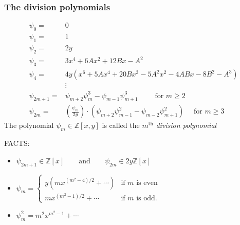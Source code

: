 \documentclass[10pt,handout]{beamer} %
\theoremstyle{definition}
\begin{document}
\begin{frame}\frametitle{The division polynomials}\pause

\begin{Definition}[Division Polynomials of $E:y^2=x^3+Ax+B$ ($p>3$)]\vspace*{-0.7cm}
\begin{align*}
        \psi_{0} =& 0\\
        \psi_{1} =& 1\\
        \psi_{2} =& 2y\\
        \psi_{3} =& 3x^{4} + 6Ax^{2} + 12Bx - A^{2}\\
        \psi_{4} =& 4y(x^{6} + 5Ax^{4} + 20Bx^{3} - 5A^{2}x^{2} - 4ABx - 8B^{2} - A^{3}) \\
        &\vdots\\
        \psi_{2m+1} =& \psi_{m+2}\psi_{m}^{3}-\psi_{m-1}\psi^{3}_{m+1} \qquad \text{ for } m \geq 2\\
        \psi_{2m}  =& \left(\frac{\psi_{m}}{2y}\right)\cdot(\psi_{m+2}\psi^{2}_{m-1}-\psi_{m-2}\psi^{2}_{m+1}) \quad \text{ for } m \geq 3
\end{align*}
The polynomial $\psi_m\in{\mathbb Z}[x,y]$ is called the $m^{\text{th}}$ \emph{division polynomial}
\end{Definition}

\begin{beamerboxesrounded}[upper=block title example,lower=block body alerted,shadow=true]{FACTS:}
\begin{itemize}
\item $\psi_{2m+1}\in\mathbb{Z}[x]\qquad\text{and}\qquad\psi_{2m}\in 2y\mathbb{Z}[x]$
\item $\psi_m=\begin{cases} y(mx^{(m^2-4)/2}+\cdots) &\text{if $m$ is even}\\
mx^{(m^2-1)/2}+\cdots &\text{if $m$ is odd.}\end{cases}$
\item $\psi_m^2=m^2x^{m^2-1}+\cdots$
\end{itemize}
\end{beamerboxesrounded}

\end{frame}
\end{document}

